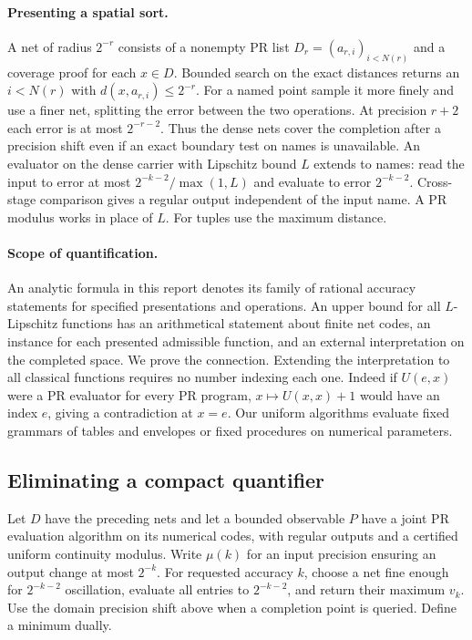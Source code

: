 \paragraph{Presenting a spatial sort.}
A net of radius $2^{-r}$ consists of a nonempty PR list $D_r=(a_{r,i})_{i<N(r)}$ and a coverage proof for each $x\in D$. Bounded search on the exact distances returns an $i<N(r)$ with $d(x,a_{r,i})\le2^{-r}$. For a named point sample it more finely and use a finer net, splitting the error between the two operations. At precision $r+2$ each error is at most $2^{-r-2}$. Thus the dense nets cover the completion after a precision shift even if an exact boundary test on names is unavailable. An evaluator on the dense carrier with Lipschitz bound $L$ extends to names: read the input to error at most $2^{-k-2}/\max(1,L)$ and evaluate to error $2^{-k-2}$. Cross-stage comparison gives a regular output independent of the input name. A PR modulus works in place of $L$. For tuples use the maximum distance.

\paragraph{Scope of quantification.}
An analytic formula in this report denotes its family of rational accuracy statements for specified presentations and operations. An upper bound for all $L$-Lipschitz functions has an arithmetical statement about finite net codes, an instance for each presented admissible function, and an external interpretation on the completed space. We prove the connection. Extending the interpretation to all classical functions requires no number indexing each one. Indeed if $U(e,x)$ were a PR evaluator for every PR program, $x\mapsto U(x,x)+1$ would have an index $e$, giving a contradiction at $x=e$. Our uniform algorithms evaluate fixed grammars of tables and envelopes or fixed procedures on numerical parameters.

\subsection{Eliminating a compact quantifier}

Let $D$ have the preceding nets and let a bounded observable $P$ have a joint PR evaluation algorithm on its numerical codes, with regular outputs and a certified uniform continuity modulus. Write $\mu(k)$ for an input precision ensuring an output change at most $2^{-k}$. For requested accuracy $k$, choose a net fine enough for $2^{-k-2}$ oscillation, evaluate all entries to $2^{-k-2}$, and return their maximum $v_k$. Use the domain precision shift above when a completion point is queried. Define a minimum dually.

